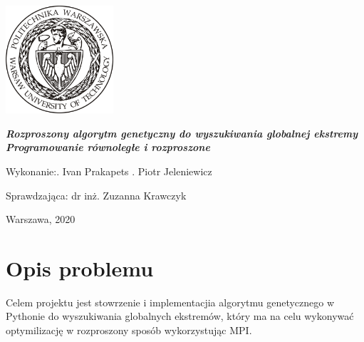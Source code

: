 \documentclass[a4paper, 12pt]{article}
\newcommand{\mainmatter}{\clearpage \cfoot{\thepage\ of \pageref{LastPage}}
\pagenumbering{arabic}}
\begin{document}
	\begin{titlepage}
\includegraphics[width = 40mm]{logo.jpg}
		\begin{center}
    			\vspace{3cm}
    					\Large\textit{\textbf{Rozproszony algorytm genetyczny  do wyszukiwania globalnej ekstremy}}
    					\Large\textit{\textbf{Programowanie równoległe i rozproszone}}
   			\vspace{4cm}
		\end{center} 

		\hfill\begin{minipage}{0.54\textwidth}
			\Large Wykonanie:. Ivan Prakapets  . Piotr Jeleniewicz 
		\vspace{\baselineskip}
		\end{minipage}
		
		\hfill\begin{minipage}{0.54\textwidth}
			\Large Sprawdzająca:\newline
		 		dr inż. Zuzanna Krawczyk
\vspace{\baselineskip}
		\end{minipage}
	
		\hfill\begin{minipage}{0.7\textwidth}
		\vspace{1cm}
			\Large Warszawa, 2020
			\vspace{\baselineskip}
		\end{minipage}
	\end{titlepage}
\newpage
\mainmatter
\setlength{\headheight}{15pt}
\doublespacing
\tableofcontents
\newpage

\linespread{0.5}

\section{Opis problemu}
\hspace*{1cm} Celem projektu jest stowrzenie i implementacjia algorytmu genetycznego w Pythonie do wyszukiwania globalnych ekstremów, który ma na celu wykonywać optymilizację w rozproszony sposób wykorzystując MPI.
\end{document}
